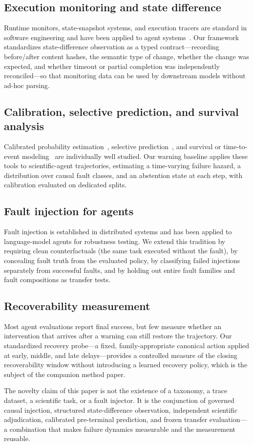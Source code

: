 \subsection{Execution monitoring and state difference}

Runtime monitors, state-snapshot systems, and execution tracers are standard
in software engineering and have been applied to agent
systems~\citep{shinn2024}. Our framework standardizes state-difference
observation as a typed contract—recording before/after content hashes, the
semantic type of change, whether the change was expected, and whether
timeout or partial completion was independently reconciled—so that
monitoring data can be used by downstream models without ad-hoc parsing.

\subsection{Calibration, selective prediction, and survival analysis}

Calibrated probability estimation~\citep{guo2017}, selective
prediction~\citep{geifman2017}, and survival or time-to-event
modeling~\citep{cox1972} are individually well studied. Our warning baseline
applies these tools to scientific-agent trajectories, estimating a
time-varying failure hazard, a distribution over causal fault classes, and
an abstention state at each step, with calibration evaluated on dedicated
splits.

\subsection{Fault injection for agents}

Fault injection is established in distributed systems and has been applied
to language-model agents for robustness testing. We extend this tradition
by requiring clean counterfactuals (the same task executed without the
fault), by concealing fault truth from the evaluated policy, by classifying
failed injections separately from successful faults, and by holding out
entire fault families and fault compositions as transfer tests.

\subsection{Recoverability measurement}

Most agent evaluations report final success, but few measure whether an
intervention that arrives after a warning can still restore the trajectory.
Our standardized recovery probe—a fixed, family-appropriate canonical action
applied at early, middle, and late delays—provides a controlled measure of
the closing recoverability window without introducing a learned recovery
policy, which is the subject of the companion method paper.

The novelty claim of this paper is not the existence of a taxonomy, a trace
dataset, a scientific task, or a fault injector. It is the conjunction of
governed causal injection, structured state-difference observation,
independent scientific adjudication, calibrated pre-terminal prediction, and
frozen transfer evaluation—a combination that makes failure dynamics
measurable and the measurement reusable.

